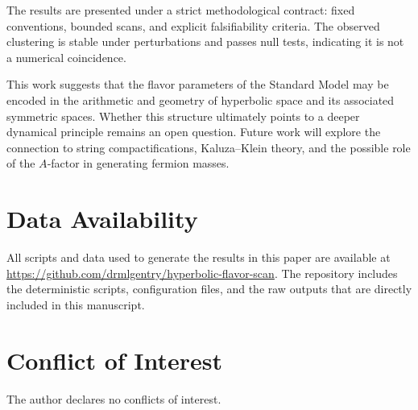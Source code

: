 \documentclass[12pt]{article}
\theoremstyle{definition}
\begin{document}
The results are presented under a strict methodological contract: fixed conventions, bounded scans, and explicit falsifiability criteria. The observed clustering is stable under perturbations and passes null tests, indicating it is not a numerical coincidence.

This work suggests that the flavor parameters of the Standard Model may be encoded in the arithmetic and geometry of hyperbolic space and its associated symmetric spaces. Whether this structure ultimately points to a deeper dynamical principle remains an open question. Future work will explore the connection to string compactifications, Kaluza–Klein theory, and the possible role of the $A$‑factor in generating fermion masses.

\section*{Data Availability}
All scripts and data used to generate the results in this paper are available at \url{https://github.com/drmlgentry/hyperbolic-flavor-scan}. The repository includes the deterministic scripts, configuration files, and the raw outputs that are directly included in this manuscript.

\section*{Conflict of Interest}
The author declares no conflicts of interest.
\end{document}
